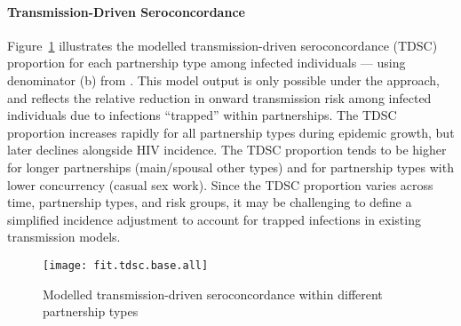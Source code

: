 \paragraph{Transmission-Driven Seroconcordance}
Figure~\ref{fig:fit.tdsc.foi} illustrates the modelled
transmission-driven seroconcordance (TDSC) proportion for each partnership type
among infected individuals --- \ie using denominator (b) from .
This model output is only possible under the \epa approach, and reflects
the relative reduction in onward transmission risk among infected individuals
due to infections ``trapped'' within partnerships.
The TDSC proportion increases rapidly for all partnership types during epidemic growth,
but later declines alongside HIV incidence.
The TDSC proportion tends to be higher for
longer partnerships (\eg main/spousal \vs other types) and for
partnership types with lower concurrency (\eg casual \vs sex work).
Since the TDSC proportion varies across time, partnership types, and risk groups,
it may be challenging to define a simplified incidence adjustment
to account for trapped infections in existing transmission models.
\begin{figure}
  \centering\texttt{[image: fit.tdsc.base.all]}
  \caption{Modelled transmission-driven seroconcordance within different partnership types}
  \label{fig:fit.tdsc.foi}
\end{figure}

